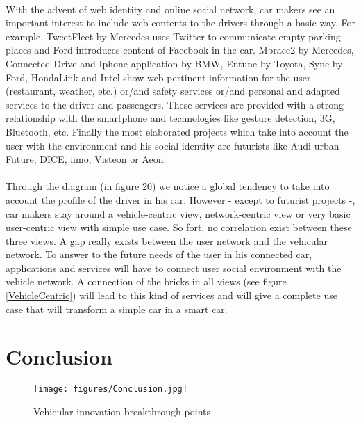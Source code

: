 \documentclass[a4paper]{article}
\begin{document}
\paragraph{}With the advent of web identity and online social network, car makers see an important interest to include web contents to the drivers through a basic way. For example, TweetFleet by Mercedes uses Twitter to communicate empty parking places and Ford introduces content of Facebook in the car. Mbrace2 by Mercedes, Connected Drive and Iphone application by BMW, Entune by Toyota, Sync by Ford, HondaLink and Intel show web pertinent information for the user (restaurant, weather, etc.) or/and safety services or/and personal and adapted services to the driver and passengers. These services are provided with a strong relationship with the smartphone and technologies like gesture detection, 3G, Bluetooth, etc. Finally the most elaborated projects which take into account the user with the environment and his social identity are futurists like Audi urban Future, DICE, iimo, Visteon or Aeon.

\paragraph{}Through the diagram (in figure 20) we notice a global tendency to take into account the profile of the driver in his car. However - except to futurist projects -, car makers stay around a vehicle-centric view, network-centric view or very basic user-centric view with simple use case. So fort, no correlation exist between these three views. A gap really exists between the user network and the vehicular network. To answer to the future needs of the user in his connected car, applications and services will have to connect user social environment with the vehicle network. A connection of the bricks in all views (see figure \ref{VehicleCentric}) will lead to this kind of services and will give a complete use case that will transform a simple car in a smart car. 

 \section{Conclusion}

\begin{figure}[!htb]
\begin{center}
\texttt{[image: figures/Conclusion.jpg]}
\caption{Vehicular innovation breakthrough points}
\label{Innovation}
\end{center}
\end{figure}
\end{document}
